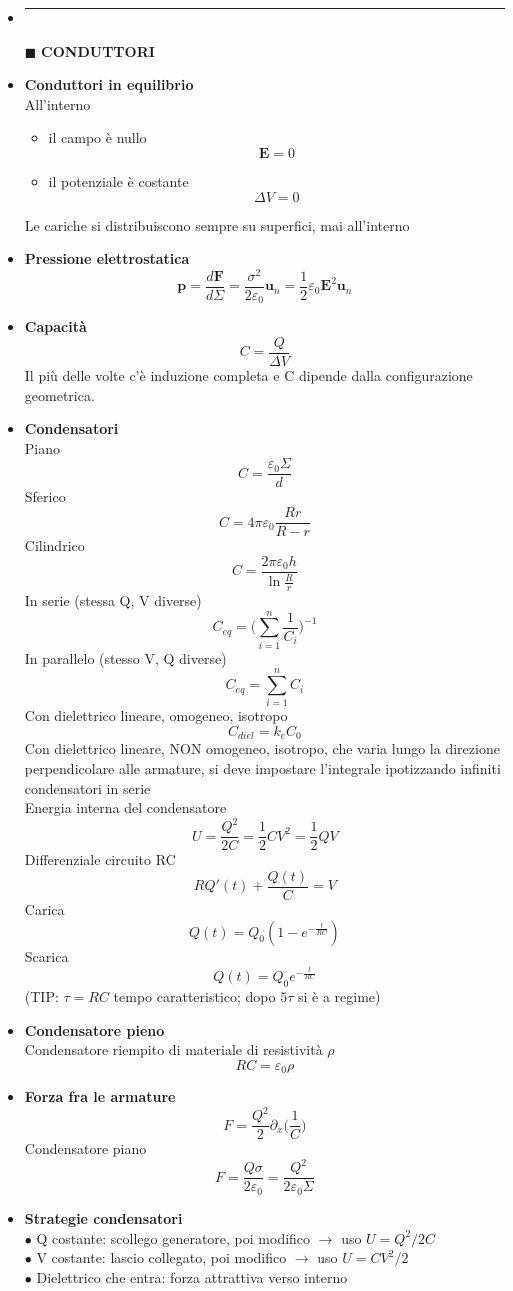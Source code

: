 \documentclass{book}
\newcommand{\g}{\textbf}
\newcommand{\h}{\mathbf}
\newcommand{\e}{\begin{equation}}
\newcommand{\ex}{\end{equation} }
\renewcommand{\it}{\item[$\cdot$]}
\newcommand{\sep}{\item[]\rule{\linewidth}{0.4pt}}
\begin{document}
\begin{multicols}{4}
\begin{itemize}
\sep
\item [$\blacksquare$] \g{CONDUTTORI}
    \it \g{Conduttori in equilibrio} \\
    All’interno
    \begin{itemize}
        \item il campo è nullo \e{\h{E}=0} \ex
        \item il potenziale è costante \e{\Delta V=0} \ex
    \end{itemize}
    Le cariche si distribuiscono sempre su superfici, mai all’interno
    \it \g{Pressione elettrostatica}
        \e{\h{p}=\frac{d\h{F}}{d\Sigma}=\frac{\sigma^2}{2\varepsilon_0}\h{u}_n=\frac{1}{2}\varepsilon_0 \h{E}^2 \h{u}_n} \ex
    \it \g{Capacità}
        \e{C=\frac{Q}{\Delta V}} \ex
        Il più delle volte c'è induzione completa e C dipende dalla configurazione geometrica.
    \it \g{Condensatori} \\
    Piano
        \e{C=\frac{\varepsilon_0 \Sigma}{d}} \ex
    Sferico
        \e{C=4\pi\varepsilon_0\frac{Rr}{R-r}} \ex
    Cilindrico
        \e{C=\frac{2\pi\varepsilon_0 h}{\ln \frac{R}{r}}} \ex
    In serie (stessa Q, V diverse)
        \e{C_{eq}=\biggl( \sum_{i=1}^n \frac{1}{C_i} \biggr)^{-1}} \ex
    In parallelo (stesso V, Q diverse)
        \e{C_{eq}= \sum_{i=1}^n C_i} \ex
    Con dielettrico lineare, omogeneo, isotropo
        \e{C_{diel}=k_e C_0} \ex
    Con dielettrico lineare, NON omogeneo, isotropo, che varia lungo la direzione perpendicolare alle armature, si deve impostare  l'integrale ipotizzando infiniti condensatori in serie\\
    
    Energia interna del condensatore
        \e{U=\frac{Q^2}{2C}=\frac{1}{2}CV^2=\frac{1}{2}QV} \ex
    Differenziale circuito RC
        \e{RQ'(t)+\frac{Q(t)}{C}=V} \ex
    Carica
        \e{Q(t)=Q_0(1-e^{-\frac{t}{RC}})} \ex
    Scarica
        \e{Q(t)=Q_0 e^{-\frac{t}{RC}}} \ex
        (TIP: $\tau=RC$ tempo caratteristico; dopo $5\tau$ si è a regime)
    \it \g{Condensatore pieno} \\
        Condensatore riempito di materiale di resistività $\rho$
        \e{RC=\varepsilon_0\rho} \ex
    \it \g{Forza fra le armature}
        \e{F=\frac{Q^2}{2}\partial_x \biggl(\frac{1}{C}\biggr)}\ex
        Condensatore piano
        \e{F=\frac{Q\sigma}{2\varepsilon_0}=\frac{Q^2}{2\varepsilon_0\Sigma}} \ex
    \it \g{Strategie condensatori} \\
        $\bullet$ Q costante: scollego generatore, poi modifico $\to$ uso $U=Q^2/2C$ \\
        $\bullet$ V costante: lascio collegato, poi modifico $\to$ uso $U=CV^2/2$ \\
        $\bullet$ Dielettrico che entra: forza attrattiva verso interno \\


\end{itemize}
\end{multicols}
\end{document}

